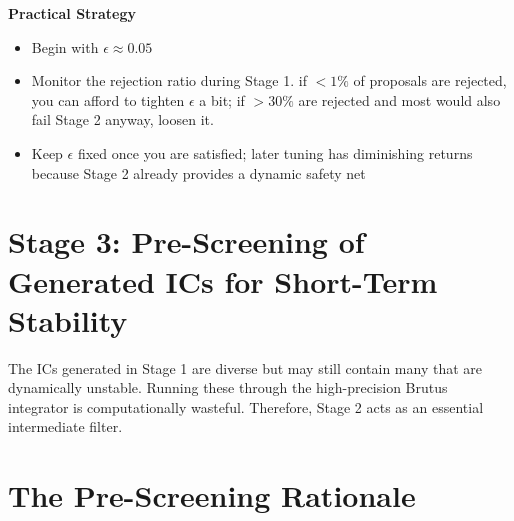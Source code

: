 \documentclass{article}
\begin{document}
\textbf{Practical Strategy}

\begin{itemize}
    \item Begin with $\epsilon \approx 0.05$
    \item Monitor the rejection ratio during Stage 1. if $<1\%$ of proposals are rejected, you can afford to tighten $\epsilon$ a bit; if $>30\%$ are rejected and most would also fail Stage 2 anyway, loosen it.
    \item Keep $\epsilon$ fixed once you are satisfied; later tuning has diminishing returns because Stage 2 already provides a dynamic safety net
\end{itemize}



\section*{Stage 3: Pre-Screening of Generated ICs for Short-Term Stability}

The ICs generated in Stage 1 are diverse but may still contain many that are dynamically unstable. Running these through the high-precision Brutus integrator is computationally wasteful. Therefore, Stage 2 acts as an essential intermediate filter.

\section{The Pre-Screening Rationale}
\end{document}
